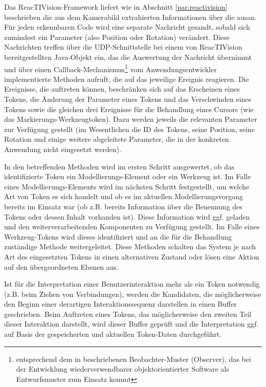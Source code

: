 Das ReacTIVision-Framework liefert wie in Abschnitt \ref{par:reactivision} beschrieben die aus dem Kamerabild extrahierten Informationen über die ausan. Für jeden erkennbaren Code wird eine separate Nachricht gesandt, sobald sich zumindest ein Parameter (also Position oder Rotation) verändert. Diese Nachrichten treffen über die UDP-Schnittstelle bei einem von ReacTIVision bereitgestellten Java-Objekt ein, das die Auswertung der Nachricht übernimmt und über einen Callback-Mechanismus\footnote{entsprechend dem in \citep{Gamma95} beschriebenen Beobachter-Muster (Observer), das bei der Entwicklung wiederverwendbarer objektorientierter Software als Entwurfsmuster zum Einsatz kommt} vom Anwendungsentwickler implementierte Methoden aufruft, die auf das jeweilige Ereignis reagieren. Die Ereignisse, die auftreten können, beschränken sich auf das Erscheinen eines Tokens, die Änderung der Parameter eines Tokens und das Verschwinden eines Tokens sowie die gleichen drei Ereignisse für die Behandlung eines Cursors (wie das Markierungs-Werkzeugtoken). Dazu werden jeweils die relevanten Parameter zur Verfügung gestellt (im Wesentlichen die ID des Tokens, seine Position, seine Rotation und einige weitere abgeleitete Parameter, die in der konkreten Anwendung nicht eingesetzt werden).

In den betreffenden Methoden wird im ersten Schritt ausgewertet, ob das identifizierte Token ein Modellierungs-Element oder ein Werkzeug ist. Im Falle eines Modellierungs-Elements wird im nächsten Schritt festgestellt, um welche Art von Token es sich handelt und ob es im aktuellen Modellierungsvorgang bereits im Einsatz war (ob z.B. bereits Information über die Benennung des Tokens oder dessen Inhalt vorhanden ist). Diese Information wird ggf. geladen und den weiterverarbeitenden Komponenten zu Verfügung gestellt. Im Falle eines Werkzeug-Tokens wird dieses identifiziert und an die für die Behandlung zuständige Methode weitergeleitet. Diese Methoden schalten das System je nach Art des eingesetzten Tokens in einen alternativen Zustand oder lösen eine Aktion auf den übergeordneten Ebenen aus.

Ist für die Interpretation einer Benutzerinteraktion mehr als ein Token notwendig (z.B. beim Ziehen von Verbindungen), werden die Kandidaten, die möglicherweise den Beginn einer derartigen Interaktionssequenz darstellen in einen Buffer geschrieben. Beim Auftreten eines Tokens, das möglicherweise den zweiten Teil dieser Interaktion darstellt, wird dieser Buffer geprüft und die Interpretation ggf. auf Basis der gespeicherten und aktuellen Token-Daten durchgeführt.

